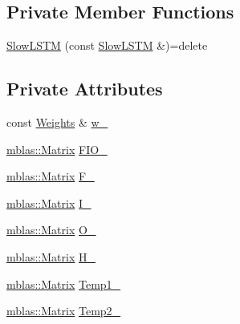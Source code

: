\subsection*{Private Member Functions}
\begin{DoxyCompactItemize}
\item 
\hyperlink{classamunmt_1_1GPU_1_1SlowLSTM_a91b93e0bbd407c7042e4322e5a44cd9b}{Slow\+L\+S\+TM} (const \hyperlink{classamunmt_1_1GPU_1_1SlowLSTM}{Slow\+L\+S\+TM} \&)=delete
\end{DoxyCompactItemize}
\subsection*{Private Attributes}
\begin{DoxyCompactItemize}
\item 
const \hyperlink{structamunmt_1_1GPU_1_1Weights}{Weights} \& \hyperlink{classamunmt_1_1GPU_1_1SlowLSTM_a200f343f4c27af61742a106f78f6d564}{w\+\_\+}
\item 
\hyperlink{namespaceamunmt_1_1GPU_1_1mblas_ab67821a8254de53e45a623cf73c0aef6}{mblas\+::\+Matrix} \hyperlink{classamunmt_1_1GPU_1_1SlowLSTM_aa80d0bb5090fbe2a89b7117f89433b57}{F\+I\+O\+\_\+}
\item 
\hyperlink{namespaceamunmt_1_1GPU_1_1mblas_ab67821a8254de53e45a623cf73c0aef6}{mblas\+::\+Matrix} \hyperlink{classamunmt_1_1GPU_1_1SlowLSTM_abe8f110d7c7d770c0e80ceb720a81750}{F\+\_\+}
\item 
\hyperlink{namespaceamunmt_1_1GPU_1_1mblas_ab67821a8254de53e45a623cf73c0aef6}{mblas\+::\+Matrix} \hyperlink{classamunmt_1_1GPU_1_1SlowLSTM_ab35898fc2b68a55fe0f1e0ab0d88424e}{I\+\_\+}
\item 
\hyperlink{namespaceamunmt_1_1GPU_1_1mblas_ab67821a8254de53e45a623cf73c0aef6}{mblas\+::\+Matrix} \hyperlink{classamunmt_1_1GPU_1_1SlowLSTM_a8cfd9b003eef67eccad0d0b65425005e}{O\+\_\+}
\item 
\hyperlink{namespaceamunmt_1_1GPU_1_1mblas_ab67821a8254de53e45a623cf73c0aef6}{mblas\+::\+Matrix} \hyperlink{classamunmt_1_1GPU_1_1SlowLSTM_ad43e82ae91c4f3968ebb44110865d8b6}{H\+\_\+}
\item 
\hyperlink{namespaceamunmt_1_1GPU_1_1mblas_ab67821a8254de53e45a623cf73c0aef6}{mblas\+::\+Matrix} \hyperlink{classamunmt_1_1GPU_1_1SlowLSTM_a7f4c6738987f74b5e9149f1d7fe0252d}{Temp1\+\_\+}
\item 
\hyperlink{namespaceamunmt_1_1GPU_1_1mblas_ab67821a8254de53e45a623cf73c0aef6}{mblas\+::\+Matrix} \hyperlink{classamunmt_1_1GPU_1_1SlowLSTM_a3a29c35d0a5a19dcf9111445f1708d11}{Temp2\+\_\+}
\end{DoxyCompactItemize}


